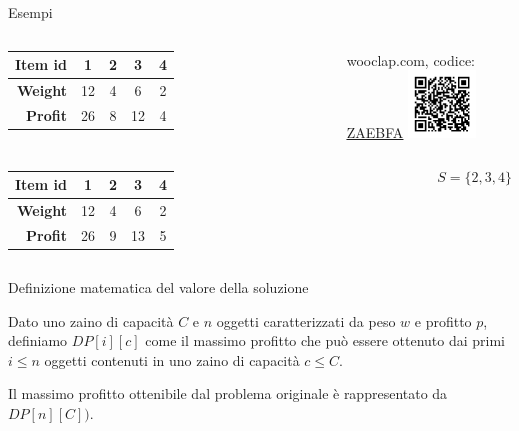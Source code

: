 \begin{frame}{Esempi}

\vspace{-9pt}

\begin{columns}[T]
\begin{tabular}{|r|c|c|c|c|}
\hline
\textbf{Item id} & \textbf{1} & \textbf{2} & \textbf{3} & \textbf{4}\\\hline
\textbf{Weight} & 12 & 4 & 6 & 2 \\\hline
\textbf{Profit} & 26 & 8 & 12 & 4 \\\hline 
\end{tabular} 
wooclap.com, codice: \href{https://app.wooclap.com/ZAEBFA}{\alert{\underline{ZAEBFA}}}
\includegraphics[width=1.8cm]{qrcode-13-pd1.png}\\
\end{columns}

\smallskip
{}

\pause
\smallskip
{}

\begin{columns}[T]
\begin{tabular}{|r|c|c|c|c|}
\hline
\textbf{Item id} & \textbf{1} & \textbf{2} & \textbf{3} & \textbf{4}\\\hline
\textbf{Weight} & 12 & 4 & 6 & 2 \\\hline
\textbf{Profit} & 26 & 9 & 13 & 5 \\\hline 
\end{tabular} 
\pause
{}
\[S = \{ 2,3, 4 \}\]
\end{columns}
\end{frame}

\begin{frame}{Definizione matematica del valore della soluzione}

\vspace{-9pt}
\begin{myboxtitle}
Dato uno zaino di capacità $C$ e $n$ oggetti caratterizzati
da peso $w$ e profitto $p$, definiamo $\mathit{DP}[i][c]$ come il
massimo profitto che può essere ottenuto dai primi $i \leq n$
oggetti contenuti in uno zaino di capacità $c \leq C$.
\end{myboxtitle}

\begin{myboxtitle}
Il massimo profitto ottenibile dal problema originale è rappresentato da $\mathit{DP}[n][C])$.
\end{myboxtitle}

\end{frame}


